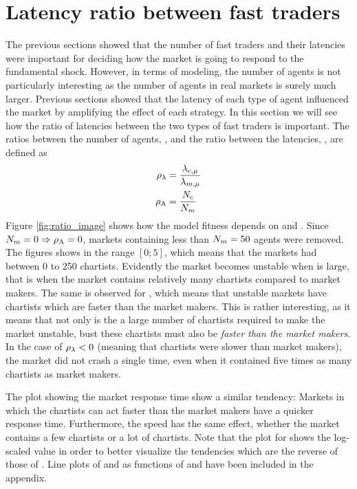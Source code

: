 \section{Latency ratio between fast traders}
The previous sections showed that the number of fast traders and their latencies were important for deciding how the market is going to respond to the fundamental shock. However, in terms of modeling, the number of agents is not particularly interesting as the number of agents in real markets is surely much larger. Previous sections showed that the latency of each type of agent influenced the market by amplifying the effect of each strategy. In this section we will see how the ratio of latencies between the two types of fast traders is important. The ratios between the number of agents, \ratioagents{}, and the ratio between the latencies, \ratiolatency, are defined as
\begin{align}
\rho_\lambda &= \frac{\lambda_{c, \mu}}{\lambda_{m, \mu}}\\
\rho_\text{A} &= \frac{N_{c}}{N_{m}}
\end{align}
Figure \ref{fig:ratio_image} shows how the model fitness depends on \ratiolatency{} and \ratioagents. Since $N_{m} = 0 \Rightarrow \rho_\text{A} = 0$, markets containing less than $N_{m} = 50$ agents were removed. The figures shows \ratioagents{} in the range $[0;5]$, which means that the markets had between 0 to 250 chartists. Evidently the market becomes unstable when \ratioagents is large, that is when the market contains relatively many chartists compared to market makers. The same is observed for \ratiolatency, which means that unstable markets have chartists which are faster than the market makers. This is rather interesting, as it means that not only is the a large number of chartists required to make the market unstable, bust these chartists must also be \textit{faster than the market makers}. In the case of $\rho_\lambda < 0$ (meaning that chartists were slower than market makers), the market did not crash a single time, even when it contained five times as many chartists as market makers. 

The plot showing the market response time \timetoreachnewfundamental{} show a similar tendency: Markets in which the chartists can act faster than the market makers have a quicker response time. Furthermore, the speed has the same effect, whether the market contains a few chartists or a lot of chartists. Note that the plot for \overshoot{} shows the log-scaled value in order to better visualize the tendencies which are the reverse of those of \timetoreachnewfundamental. Line plots of \ratioagents{} and \ratiolatency{} as functions of \ssmmlatencymu{} and \sclatencymu{} have been included in the appendix.

